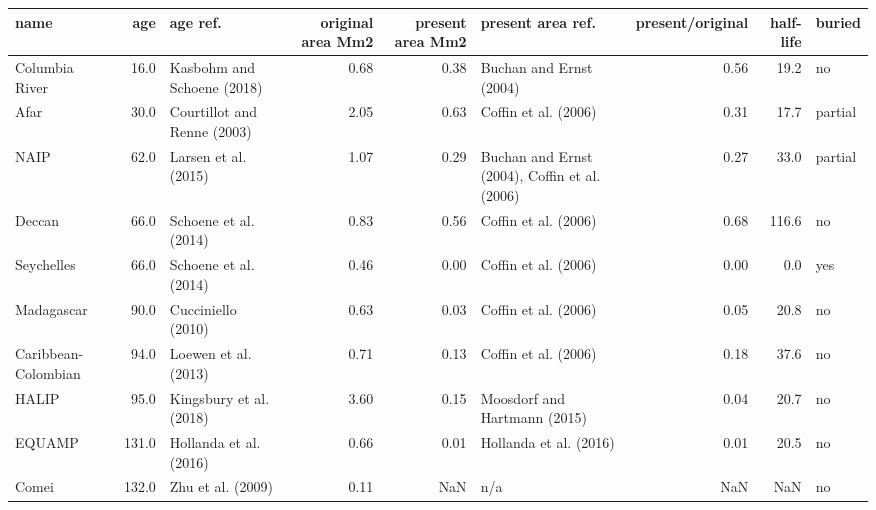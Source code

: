 \begin{tabular}{lrlrrlrrl}
\toprule
                name &    age &                      age ref. &  original area Mm2 &  present area Mm2 &                              present area ref. &  present/original &  half-life &   buried \\
\midrule
      Columbia River &   16.0 &    Kasbohm and Schoene (2018) &               0.68 &              0.38 &                        Buchan and Ernst (2004) &              0.56 &       19.2 &       no \\
                Afar &   30.0 &   Courtillot and Renne (2003) &               2.05 &              0.63 &                           Coffin et al. (2006) &              0.31 &       17.7 &  partial \\
                NAIP &   62.0 &          Larsen et al. (2015) &               1.07 &              0.29 &  Buchan and Ernst (2004), Coffin et al. (2006) &              0.27 &       33.0 &  partial \\
              Deccan &   66.0 &         Schoene et al. (2014) &               0.83 &              0.56 &                           Coffin et al. (2006) &              0.68 &      116.6 &       no \\
          Seychelles &   66.0 &         Schoene et al. (2014) &               0.46 &              0.00 &                           Coffin et al. (2006) &              0.00 &        0.0 &      yes \\
          Madagascar &   90.0 &            Cucciniello (2010) &               0.63 &              0.03 &                           Coffin et al. (2006) &              0.05 &       20.8 &       no \\
 Caribbean-Colombian &   94.0 &          Loewen et al. (2013) &               0.71 &              0.13 &                           Coffin et al. (2006) &              0.18 &       37.6 &       no \\
               HALIP &   95.0 &       Kingsbury et al. (2018) &               3.60 &              0.15 &                   Moosdorf and Hartmann (2015) &              0.04 &       20.7 &       no \\
              EQUAMP &  131.0 &        Hollanda et al. (2016) &               0.66 &              0.01 &                         Hollanda et al. (2016) &              0.01 &       20.5 &       no \\
               Comei &  132.0 &             Zhu et al. (2009) &               0.11 &               NaN &                                            n/a &               NaN &        NaN &       no \\

\end{tabular}
